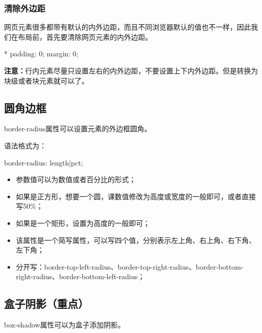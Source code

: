 \subsubsection{清除外边距}
网页元素很多都带有默认的内外边距，而且不同浏览器默认的值也不一样，因此我们在布局前，首先要清除网页元素的内外边距。

\begin{css}
	* {
		padding: 0;
		margin: 0;
	}
\end{css}

\textbf{注意：}行内元素尽量只设置左右的内外边距，不要设置上下内外边距。但是转换为块级或者块元素就可以了。
\subsection{圆角边框}
border-radius属性可以设置元素的外边框圆角。

语法格式为：
\begin{css}
	border-radius: length|pct;
\end{css}
\begin{itemize}
	\item 参数值可以为数值或者百分比的形式；
	\item 如果是正方形，想要一个圆，课数值修改为高度或宽度的一般即可，或者直接写50\%；
	\item 如果是一个矩形，设置为高度的一般即可；
	\item 该属性是一个简写属性，可以写四个值，分别表示左上角、右上角、右下角、左下角；
	\item 分开写：border-top-left-radius、border-top-right-radius、border-bottom-right-radius、border-bottom-left-radius；
\end{itemize}
\subsection{盒子阴影（重点）}
box-shadow属性可以为盒子添加阴影。

